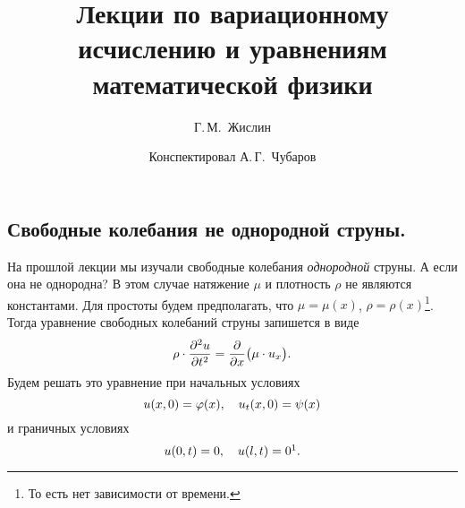 \documentclass[12pt,a4paper,openany,fleqn]{book}
\newcommand{\mc}[1]{\ensuremath{\mathcal{#1}}}
\newcommand{\pder}[2]{\ensuremath{\frac{\partial#1}{\partial#2}}}
\newcommand{\pdder}[2]{\ensuremath{\frac{\partial^2#1}{\partial#2^2}}}
\theoremstyle{definition}
\begin{document}
	\author{Г.\,М.~Жислин}
	\title{Лекции по вариационному исчислению и уравнениям математической физики}
	\date{Конспектировал А.\,Г.~Чубаров}
	
	
	
	\maketitle
	
	
	\renewcommand{\thepart}{\Asbuk{part}}
	\renewcommand{\thechapter}{\arabic{chapter}}
	\renewcommand{\thesection}{\arabic{section}}
	\renewcommand{\thesubsection}{\Roman{subsection}}
	\renewcommand{\thefootnote}{\roman{footnote}}
	\renewcommand{\phi}{\varphi}
	\renewcommand{\Re}{\ensuremath{\mc{R}e\,}}
	\renewcommand{\Im}{\ensuremath{\mc{I}m\,}}
	
	\setcounter{chapter}{12}
	\chapter{}
	\label{lecture13}
	\section{Свободные колебания не однородной струны.}
	\label{lecture13section1}
	На прошлой лекции мы изучали свободные колебания \emph{однородной} струны. А если она не однородна? В этом случае натяжение $\mu$ и плотность $\rho$ не являются константами. Для простоты будем предполагать, что $\mu=\mu(x)$, $\rho=\rho(x)$\footnote[1]{То есть нет зависимости от времени.}. Тогда уравнение свободных колебаний струны запишется в виде
	\begin{equation}\label{l13:eq:1}
		\hfill\rho\cdot\pdder{u}{t}=\pder{}{x}\big(\mu\cdot u_x\big).\hfill
	\end{equation}
	Будем решать это уравнение при начальных условиях
	\begin{equation}\label{l13:eq:2}
		\hfill u(x,0)=\phi(x),\quad u_t(x,0)=\psi(x)\hfill
	\end{equation}
	и граничных условиях
	\begin{equation}\label{l13:eq:3}
		\hfill u(0,t)=0,\quad u(l,t)=0\footnotemark{}.\hfill
	\end{equation}
\end{document}
